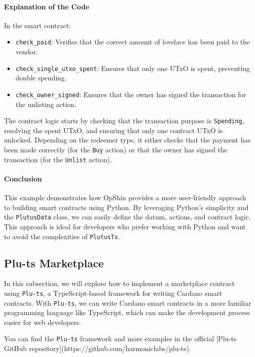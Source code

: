 \paragraph{Explanation of the Code}
In the smart contract:
\begin{itemize}
    \item \texttt{check\_paid}: Verifies that the correct amount of lovelace has been paid to the vendor.
    \item \texttt{check\_single\_utxo\_spent}: Ensures that only one UTxO is spent, preventing double spending.
    \item \texttt{check\_owner\_signed}: Ensures that the owner has signed the transaction for the unlisting action.
\end{itemize}

The contract logic starts by checking that the transaction purpose is \texttt{Spending}, resolving the spent UTxO, and ensuring that only one contract UTxO is unlocked. Depending on the redeemer type, it either checks that the payment has been made correctly (for the \texttt{Buy} action) or that the owner has signed the transaction (for the \texttt{Unlist} action).

\paragraph{Conclusion}
This example demonstrates how OpShin provides a more user-friendly approach to building smart contracts using Python. By leveraging Python's simplicity and the \texttt{PlutusData} class, we can easily define the datum, actions, and contract logic. This approach is ideal for developers who prefer working with Python and want to avoid the complexities of \texttt{PlutusTx}.


\subsection{Plu-ts Marketplace}

In this subsection, we will explore how to implement a marketplace contract using \texttt{Plu-ts}, a TypeScript-based framework for writing Cardano smart contracts. With \texttt{Plu-ts}, we can write Cardano smart contracts in a more familiar programming language like TypeScript, which can make the development process easier for web developers.

You can find the \texttt{Plu-ts} framework and more examples in the official [Plu-ts GitHub repository](https://github.com/harmoniclabs/plu-ts).


